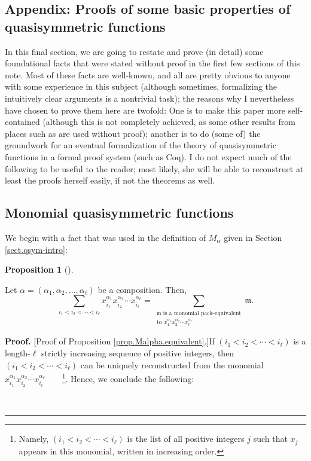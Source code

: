 \documentclass[numbers=enddot,12pt,final,onecolumn,notitlepage,abstracton]{scrartcl}
\theoremstyle{definition}
\newtheorem{prop}[theo]{Proposition}
\newenvironment{proposition}[1][]
{\begin{prop}[#1]\begin{leftbar}}
{\end{leftbar}\end{prop}}
\newenvironment{proof}[1][Proof]{\noindent\textbf{#1.} }{\ \rule{0.5em}{0.5em}}
\let\sumnonlimits\sum
\renewcommand{\sum}{\sumnonlimits\limits}
\newenvironment{verlong}{}{}
\begin{document}
\begin{verlong}
\begin{footnotesize}

\section{Appendix: Proofs of some basic properties of quasisymmetric
functions}

In this final section, we are going to restate and prove (in detail) some
foundational facts that were stated without proof in the first few sections of
this note. Most of these facts are well-known, and all are pretty obvious to
anyone with some experience in this subject (although sometimes, formalizing
the intuitively clear arguments is a nontrivial task); the reasons why I
nevertheless have chosen to prove them here are twofold: One is to make this
paper more self-contained (although this is not completely achieved, as some
other results from places such as \cite{Reiner} are used without proof);
another is to do (some of) the groundwork for an eventual formalization of the
theory of quasisymmetric functions in a formal proof system (such as Coq). I
do not expect much of the following to be useful to the reader; most likely,
she will be able to reconstruct at least the proofs herself easily, if not the
theorems as well.

\subsection{Monomial quasisymmetric functions}

We begin with a fact that was used in the definition of $M_{\alpha}$ given in
Section \ref{sect.qsym-intro}:

\begin{proposition}
\label{prop.Malpha.equivalent}Let $\alpha=\left(  \alpha_{1},\alpha_{2}%
,\ldots,\alpha_{\ell}\right)  $ be a composition. Then,%
\[
\sum_{i_{1}<i_{2}<\cdots<i_{\ell}}x_{i_{1}}^{\alpha_{1}}x_{i_{2}}^{\alpha_{2}%
}\cdots x_{i_{\ell}}^{\alpha_{\ell}}=\sum_{\substack{\mathfrak{m}\text{ is a
monomial pack-equivalent}\\\text{to }x_{1}^{\alpha_{1}}x_{2}^{\alpha_{2}%
}\cdots x_{\ell}^{\alpha_{\ell}}}}\mathfrak{m}.
\]

\end{proposition}

\begin{proof}
[Proof of Proposition \ref{prop.Malpha.equivalent}.]If $\left(  i_{1}%
<i_{2}<\cdots<i_{\ell}\right)  $ is a length-$\ell$ strictly increasing
sequence of positive integers, then $\left(  i_{1}<i_{2}<\cdots<i_{\ell
}\right)  $ can be uniquely reconstructed from the monomial $x_{i_{1}}%
^{\alpha_{1}}x_{i_{2}}^{\alpha_{2}}\cdots x_{i_{\ell}}^{\alpha_{\ell}}%
$\ \ \ \ \footnote{Namely, $\left(  i_{1}<i_{2}<\cdots<i_{\ell}\right)  $ is
the list of all positive integers $j$ such that $x_{j}$ appears in this
monomial, written in increasing order.}. Hence, we conclude the following:


\end{proof}
\end{footnotesize}
\end{verlong}
\end{document}
